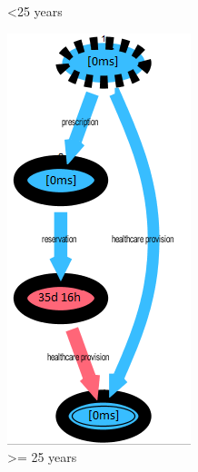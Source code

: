 \begin{figure} [htbp]
\begin{minipage}[t]{0.3\textwidth}
\caption{<25 years}
\end{minipage}
\begin{minipage}[t]{0.33\textwidth}
\centering
\includegraphics[width=\textwidth]{AmbulatorioSojournOlds}
\caption{>= 25 years}
\end{minipage}
\end{figure}\\
